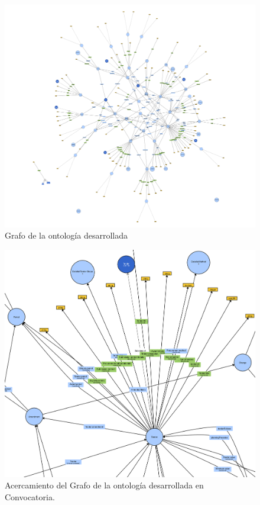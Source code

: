 \begin{figure}[ht!]
    \includegraphics[width=180mm]{figuras/grafoOCDS.png}
    \caption{Grafo de la ontología desarrollada}
    \label{img:grafo ontologia desarrolla}
    \end{figure}

    \begin{figure}[ht!]
        \includegraphics[width=150mm]{figuras/zoomTender.png}
        \caption{Acercamiento del Grafo de la ontología desarrollada en Convocatoria.}
        \label{img:zoomTender}
        \end{figure}


